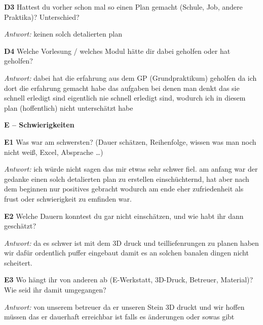 {\par\noindent \textbf{D3} Hattest du vorher schon mal so einen Plan gemacht (Schule, Job, andere Praktika)? Unterschied?\par
\par\noindent\emph{Antwort:} keinen solch detalierten plan\par\smallskip
\par\noindent \textbf{D4} Welche Vorlesung / welches Modul hätte dir dabei geholfen oder hat geholfen?\par
\par\noindent\emph{Antwort:} dabei hat die erfahrung aus dem GP (Grundpraktikum) geholfen da ich dort die erfahrung gemacht habe das aufgaben bei denen man denkt das sie schnell erledigt sind eigentlich nie schnell erledigt sind, wodurch ich in diesem plan (hoffentlich) nicht unterschätzt habe\par\smallskip
\par\medskip\noindent\textbf{E – Schwierigkeiten}\par
\par\noindent \textbf{E1} Was war am schwersten? (Dauer schätzen, Reihenfolge, wissen was man noch nicht weiß, Excel, Absprache …)\par
\par\noindent\emph{Antwort:} ich würde nicht sagen das mir etwas sehr schwer fiel. am anfang war der gedanke einen solch detalierten plan zu erstellen einschüchternd, hat aber nach dem beginnen nur positives gebracht wodurch am ende eher zufriedenheit als frust oder schwierigkeit zu emfinden war.\par\smallskip
\par\noindent \textbf{E2} Welche Dauern konntest du gar nicht einschätzen, und wie habt ihr dann geschätzt?\par
\par\noindent\emph{Antwort:} da es schwer ist mit dem 3D druck und teilliefenrungen zu planen haben wir dafür ordentlich puffer eingebaut damit es an solchen banalen dingen nicht scheitert.\par\smallskip
\par\noindent \textbf{E3} Wo hängt ihr von anderen ab (E-Werkstatt, 3D-Druck, Betreuer, Material)? Wie seid ihr damit umgegangen?\par
\par\noindent\emph{Antwort:} von unserem betreuer da er unseren Stein 3D druckt und wir hoffen müssen das er dauerhaft erreichbar ist falls es änderungen oder sowas gibt\par\smallskip
}
